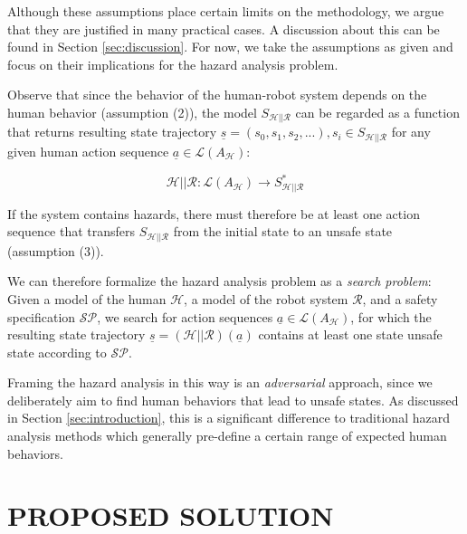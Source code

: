 \documentclass[letterpaper, 10 pt, conference]{ieeeconf}  %
\begin{document}
Although these assumptions place certain limits on the methodology, we argue that they are justified in many practical cases. A discussion about this can be found in Section \ref{sec:discussion}. For now, we take the assumptions as given and focus on their implications for the hazard analysis problem.

Observe that since the behavior of the human-robot system depends on the human behavior (assumption (2)), the model $S_{\mathcal{H} || \mathcal{R}}$ can be regarded as a function that returns resulting state trajectory $\underline{s}=(s_0, s_1, s_2, ...), s_i \in S_{\mathcal{H} || \mathcal{R}}$ for any given human action sequence $\underline{a} \in \mathcal{L}(A_\mathcal{H})$:

\begin{equation}
    \mathcal{H} || \mathcal{R}: \mathcal{L}(A_\mathcal{H}) \rightarrow S_{\mathcal{H} || \mathcal{R}}^{*}
\end{equation}

If the system contains hazards, there must therefore be at least one action sequence that transfers $S_{\mathcal{H} || \mathcal{R}}$ from the initial state to an unsafe state (assumption (3)).

We can therefore formalize the hazard analysis problem as a \textit{search problem}: Given a model of the human $\mathcal{H}$, a model of the robot system $\mathcal{R}$, and a safety specification $\mathcal{SP}$, we search for action sequences $\underline{a} \in \mathcal{L}(A_\mathcal{H})$, for which the resulting state trajectory $\underline{s}=(\mathcal{H} || \mathcal{R}) (\underline{a})$ contains at least one state unsafe state according to $\mathcal{SP}$.

Framing the hazard analysis in this way is an \textit{adversarial} approach, since we deliberately aim to find human behaviors that lead to unsafe states. As discussed in Section \ref{sec:introduction}, this is a significant difference to traditional hazard analysis methods which generally pre-define a certain range of expected human behaviors.

\section{PROPOSED SOLUTION}
\label{sec:solution}
\end{document}
